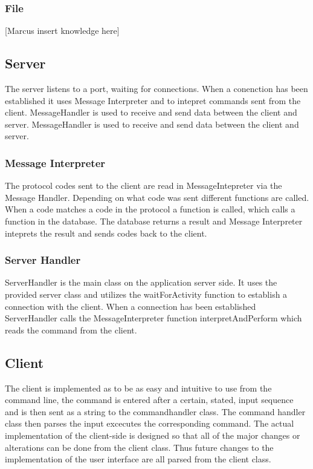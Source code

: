 \documentclass[a4paper, titlepage]{article}
\begin{document}
\subsubsection{File}
[Marcus insert knowledge here]

\subsection{Server}
 The server listens to a port, waiting for connections. When a conenction has been established it uses Message Interpreter and to intepret commands sent from the client. MessageHandler is used to receive and send data between the client and server. MessageHandler is used to receive and send data between the client and server.   

\subsubsection{Message Interpreter}
The protocol codes sent to the client are read in MessageIntepreter via the Message Handler. Depending on what code was sent different functions are called. When a code matches a code in the protocol a function is called, which calls a function in the database. The database returns a result and Message Interpreter inteprets the result and sends codes back to the client.

\subsubsection{Server Handler}
ServerHandler is the main class on the application server side. It uses the provided server class and utilizes the waitForActivity function to establish a connection with the client. When a connection has been established ServerHandler calls the MessageInterpreter function interpretAndPerform which reads the command from the client.

\subsection{Client}
The client is implemented as to be as easy and intuitive to use from the command line, the command is entered after a certain, stated, input sequence and is then sent as a string to the commandhandler class. The command handler class then parses the input excecutes the corresponding command. The actual implementation of the client-side is designed so that all of the major changes or alterations can be done from the client class. Thus future changes to the implementation of the user interface are all parsed from the client class.
\end{document}
